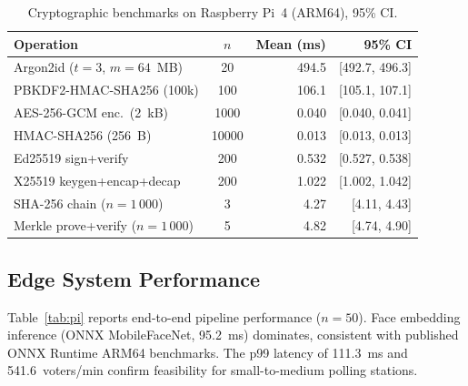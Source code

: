 \documentclass[pdflatex,sn-vancouver-num]{sn-jnl}%
\theoremstyle{thmstyleone}%
\theoremstyle{thmstyletwo}%
\theoremstyle{thmstylethree}%
\begin{document}
\begin{table}[t]
\caption{Cryptographic benchmarks on Raspberry Pi~4 (ARM64), 95\% CI.}
\label{tab:crypto}%
\begin{tabular}{|l|c|r|r|}
  \hline
  Operation & \(n\) & Mean (ms) & 95\% CI \\
  \hline
  Argon2id (\(t{=}3\), \(m{=}64\)~MB) & 20    & 494.5 & [492.7, 496.3] \\
  PBKDF2-HMAC-SHA256 (100k)            & 100   & 106.1 & [105.1, 107.1] \\
  AES-256-GCM enc.\ (2~kB)            & 1000  & 0.040 & [0.040, 0.041] \\
  HMAC-SHA256 (256~B)                  & 10000 & 0.013 & [0.013, 0.013] \\
  Ed25519 sign+verify                  & 200   & 0.532 & [0.527, 0.538] \\
  X25519 keygen+encap+decap            & 200   & 1.022 & [1.002, 1.042] \\
  SHA-256 chain (\(n{=}1\,000\))     & 3     & 4.27  & [4.11, 4.43]   \\
  Merkle prove+verify (\(n{=}1\,000\))& 5    & 4.82  & [4.74, 4.90]   \\
  \hline
\end{tabular}
\end{table}

\subsection{Edge System Performance}

Table~\ref{tab:pi} reports end-to-end pipeline performance (\(n{=}50\)). Face
embedding inference (ONNX MobileFaceNet, 95.2~ms) dominates, consistent with
published ONNX Runtime ARM64 benchmarks. The p99 latency of 111.3~ms and
541.6~voters/min confirm feasibility for small-to-medium polling stations.
\end{document}
